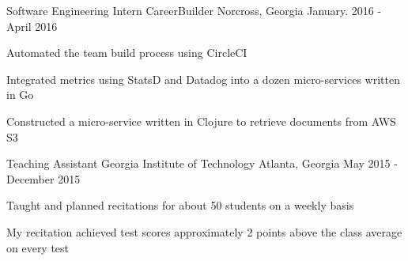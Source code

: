 

\begin{cventries}

  \cventry
    {Software Engineering Intern} %
    {CareerBuilder} %
    {Norcross, Georgia} %
    {January. 2016 - April 2016} %
    {
      \begin{cvitems} %
        \item {Automated the team build process using CircleCI}
        \item {Integrated metrics using StatsD and Datadog into a dozen micro-services written in Go}
        \item {Constructed a micro-service written in Clojure to retrieve documents from AWS S3}
      \end{cvitems}
    }

  \cventry
    {Teaching Assistant} %
    {Georgia Institute of Technology} %
    {Atlanta, Georgia} %
    {May 2015 - December 2015} %
    {
      \begin{cvitems} %
        \item {Taught and planned recitations for about 50 students on a weekly basis}
        \item {My recitation achieved test scores approximately 2 points above the class average on every test}
      \end{cvitems}
    }


\end{cventries}
